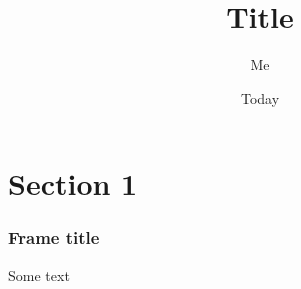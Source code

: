 \documentclass[xcolor=dvipsnames]{beamer}
\title{Title}
\author{Me}
\date{Today}
\begin{document}
    \section[My first section]{Section 1}
    \begin{frame}
        \frametitle{Frame title}
        Some text
    \end{frame}
\end{document}
